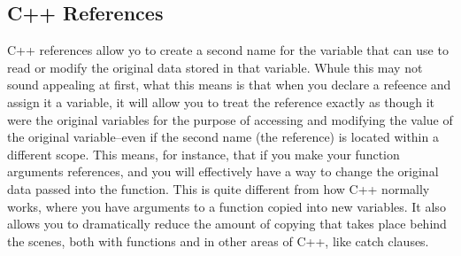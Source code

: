 	\subsection{C++ References}


		C++ references allow yo to create a second name for the variable that can use to read or modify the original data stored in that variable. Whule this may not sound appealing at first, what this means is that when you declare a refeence and assign it a variable, it will allow you to treat the reference exactly as though it were the original variables for the  purpose of accessing and modifying the value of the original variable--even if the second name (the reference) is located within a different scope. This means, for instance, that if you make your function arguments references, and you will effectively have a way to change the original data passed into the function. This is quite different from how C++ normally works, where you have arguments to a function copied into new variables. It also allows you to dramatically reduce the amount of copying that takes place behind the scenes, both with functions and in other areas of C++, like catch clauses.
